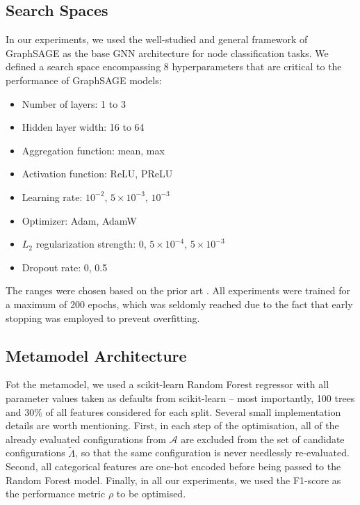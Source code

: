 \subsection{Search Spaces}

In our experiments, we used the well-studied and general framework of GraphSAGE \cite{hamilton_inductive_2017} as the base GNN architecture for node classification tasks. We defined a search space encompassing 8 hyperparameters that are critical to the performance of GraphSAGE models:
\begin{itemize}
	\item Number of layers: 1 to 3
	\item Hidden layer width: 16 to 64
	\item Aggregation function: mean, max
	\item Activation function: ReLU, PReLU
	\item Learning rate: \( 10^{-2} \), \( 5 \times 10^{-3} \), \( 10^{-3} \)
	\item Optimizer: Adam, AdamW
	\item \( L_2 \) regularization strength: 0, \( 5 \times 10^{-4} \), \( 5 \times 10^{-3} \)
	\item Dropout rate: 0, 0.5
\end{itemize}
The ranges were chosen based on the prior art \cite{hamilton_inductive_2017}. All experiments were trained for a maximum of 200 epochs, which was seldomly reached due to the fact that early stopping was employed to prevent overfitting.

\subsection{Metamodel Architecture}

Fot the metamodel, we used a scikit-learn Random Forest regressor with all parameter values taken as defaults from scikit-learn -- most importantly, 100 trees and 30\% of all features considered for each split. Several small implementation details are worth mentioning. First, in each step of the optimisation, all of the already evaluated configurations from \( \mathcal{A} \) are excluded from the set of candidate configurations \( \tilde{\Lambda} \), so that the same configuration is never needlessly re-evaluated. Second, all categorical features are one-hot encoded before being passed to the Random Forest model. Finally, in all our experiments, we used the F1-score as the performance metric \( \rho \) to be optimised.

